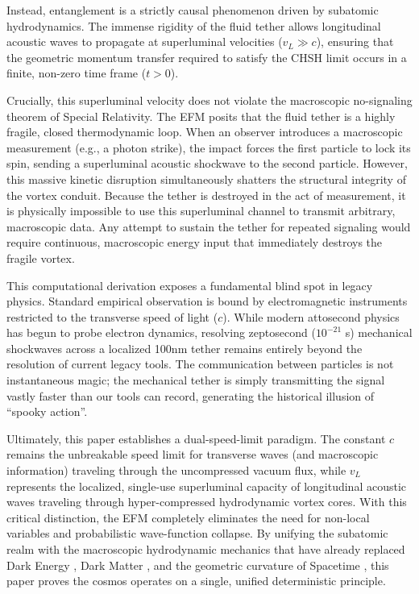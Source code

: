 \documentclass[11pt, a4paper]{article}
\begin{document}
  Instead, entanglement is a strictly causal phenomenon driven by subatomic hydrodynamics. The immense rigidity of the fluid tether allows longitudinal acoustic waves to propagate at superluminal velocities ($v_L \gg c$), ensuring that the geometric momentum transfer required to satisfy the CHSH limit occurs in a finite, non-zero time frame ($t > 0$). 
  
  Crucially, this superluminal velocity does not violate the macroscopic no-signaling theorem of Special Relativity. The EFM posits that the fluid tether is a highly fragile, closed thermodynamic loop. When an observer introduces a macroscopic measurement (e.g., a photon strike), the impact forces the first particle to lock its spin, sending a superluminal acoustic shockwave to the second particle. However, this massive kinetic disruption simultaneously shatters the structural integrity of the vortex conduit. Because the tether is destroyed in the act of measurement, it is physically impossible to use this superluminal channel to transmit arbitrary, macroscopic data. Any attempt to sustain the tether for repeated signaling would require continuous, macroscopic energy input that immediately destroys the fragile vortex.

  This computational derivation exposes a fundamental blind spot in legacy physics. Standard empirical observation is bound by electromagnetic instruments restricted to the transverse speed of light ($c$). While modern attosecond physics has begun to probe electron dynamics, resolving zeptosecond ($10^{-21}$ s) mechanical shockwaves across a localized 100nm tether remains entirely beyond the resolution of current legacy tools. The communication between particles is not instantaneous magic; the mechanical tether is simply transmitting the signal vastly faster than our tools can record, generating the historical illusion of ``spooky action''.

  Ultimately, this paper establishes a dual-speed-limit paradigm. The constant $c$ remains the unbreakable speed limit for transverse waves (and macroscopic information) traveling through the uncompressed vacuum flux, while $v_L$ represents the localized, single-use superluminal capacity of longitudinal acoustic waves traveling through hyper-compressed hydrodynamic vortex cores. With this critical distinction, the EFM completely eliminates the need for non-local variables and probabilistic wave-function collapse. By unifying the subatomic realm with the macroscopic hydrodynamic mechanics that have already replaced Dark Energy \cite{marabut2026m11}, Dark Matter \cite{marabut2026m12}, and the geometric curvature of Spacetime \cite{marabut2026m13}, this paper proves the cosmos operates on a single, unified deterministic principle.
\end{document}
